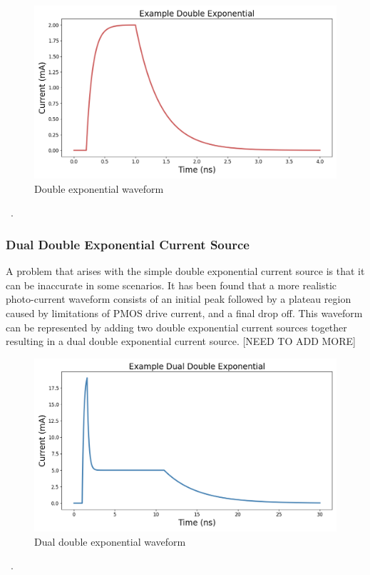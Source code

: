 \documentclass[conference]{IEEEtran}
\begin{document}
    \begin{figure}[htbp]
        \centering
        \includegraphics[width=0.95\linewidth]{EX_Double_Exponential}
        \caption{Double exponential waveform}
        \label{fig:double_exp}
    \end{figure}~\cite{Pepper1990}.

    \subsubsection{Dual Double Exponential Current Source}
    A problem that arises with the simple double exponential current source is that it can be inaccurate in some scenarios.
    It has been found that a more realistic photo-current waveform consists of an initial peak followed by a plateau region caused by limitations of PMOS drive current, and a final drop off.
    This waveform can be represented by adding two double exponential current sources together resulting in a dual double exponential current source.
    [NEED TO ADD MORE]

    \begin{figure}[htbp]
        \centering
        \includegraphics[width=0.95\linewidth]{EX_Dual_Double_Exponential}
        \caption{Dual double exponential waveform}
        \label{fig:dual_double_exp}
    \end{figure}~\cite{Pepper1990}.
\end{document}
